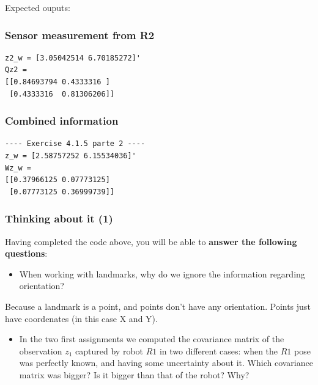 \documentclass[11pt]{article}
\providecommand{\tightlist}{%
      \setlength{\itemsep}{0pt}\setlength{\parskip}{0pt}}
\begin{document}
    {Expected ouputs:}

\hypertarget{sensor-measurement-from-r2}{%
\subsubsection{Sensor measurement from
R2}\label{sensor-measurement-from-r2}}

\begin{verbatim}
z2_w = [3.05042514 6.70185272]'
Qz2 = 
[[0.84693794 0.4333316 ]
 [0.4333316  0.81306206]]
\end{verbatim}

\hypertarget{combined-information}{%
\subsubsection{Combined information}\label{combined-information}}

\begin{verbatim}
---- Exercise 4.1.5 parte 2 ----
z_w = [2.58757252 6.15534036]'
Wz_w = 
[[0.37966125 0.07773125]
 [0.07773125 0.36999739]]
\end{verbatim}

    \hypertarget{thinking-about-it-1}{%
\subsubsection{Thinking about it (1)}\label{thinking-about-it-1}}

Having completed the code above, you will be able to \textbf{answer the
following questions}:

\begin{itemize}
\tightlist
\item
  When working with landmarks, why do we ignore the information
  regarding orientation?
\end{itemize}

Because a landmark is a point, and points don't have any orientation.
Points just have coordenates (in this case X and Y).

\begin{itemize}
\tightlist
\item
  In the two first assignments we computed the covariance matrix of the
  observation \(z_1\) captured by robot \(R1\) in two different cases:
  when the \(R1\) pose was perfectly known, and having some uncertainty
  about it. Which covariance matrix was bigger? Is it bigger than that
  of the robot? Why?
\end{itemize}
\end{document}
